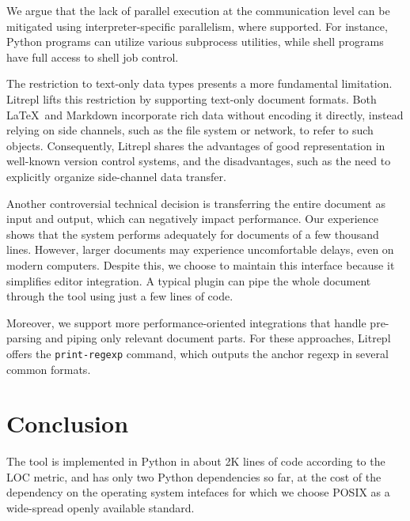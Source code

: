 \documentclass[a4paper,12pt,twocolumn]{article}
\newcommand{\Latex}{\LaTeX\ }
\begin{document}
We argue that the lack of parallel execution at the communication level can be
mitigated using interpreter-specific parallelism, where supported. For instance,
Python programs can utilize various subprocess utilities, while shell programs
have full access to shell job control.

The restriction to text-only data types presents a more fundamental limitation.
Litrepl lifts this restriction by supporting text-only document formats. Both
\Latex and Markdown incorporate rich data without encoding it directly, instead
relying on side channels, such as the file system or network, to refer to such
objects. Consequently, Litrepl shares the advantages of good representation in
well-known version control systems, and the disadvantages, such as the need to
explicitly organize side-channel data transfer.

Another controversial technical decision is transferring the entire document as
input and output, which can negatively impact performance. Our experience shows
that the system performs adequately for documents of a few thousand lines.
However, larger documents may experience uncomfortable delays, even on modern
computers. Despite this, we choose to maintain this interface because it
simplifies editor integration. A typical plugin can pipe the whole document
through the tool using just a few lines of code.

Moreover, we support more performance-oriented integrations that handle
pre-parsing and piping only relevant document parts. For these approaches,
Litrepl offers the \verb|print-regexp| command, which outputs the anchor regexp
in several common formats.

\section{Conclusion}

The tool is implemented in Python in about 2K lines of code according to the LOC
metric, and has only two Python dependencies so far, at the cost of the
dependency on the operating system intefaces for which we choose POSIX as a
wide-spread openly available standard.

\printbibliography
\end{document}
